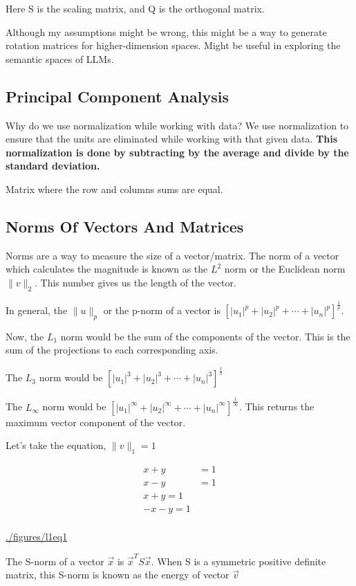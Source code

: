 \documentclass[11pt]{article}
\begin{document}
Here S is the scaling matrix, and Q is the orthogonal matrix.

Although my assumptions might be wrong, this might be a way to generate
rotation matrices for higher-dimension spaces. Might be useful in
exploring the semantic spaces of LLMs.
\subsection{Principal Component Analysis}
\label{principal-component-analysis}
Why do we use normalization while working with data? We use
normalization to ensure that the units are eliminated while working with
that given data. \textbf{This normalization is done by subtracting by the
	average and divide by the standard deviation.}

Matrix where the row and columns sums are equal.
\subsection{Norms Of Vectors And Matrices}
\label{norms-of-vectors-and-matrices}
Norms are a way to measure the size of a vector/matrix. The norm of a
vector which calculates the magnitude is known as the \(L^2\) norm or
the Euclidean norm \(\|v\|_2\). This number gives us the length of the
vector.

In general, the \(\|u\|_p\) or the p-norm of a vector is
\([|u_1|^p + |u_2|^p + \cdots + |u_n|^p]^{\frac{1}{p}}\).

Now, the \(L_1\) norm would be the sum of the components of the vector.
This is the sum of the projections to each corresponding axis.

The \(L_3\) norm would be
\([|u_1|^3 + |u_2|^3 + \cdots + |u_n|^3]^{\frac{1}{3}}\)

The \(L_\infty\) norm would be
\([|u_1|^\infty + |u_2|^\infty + \cdots + |u_n|^\infty]^{\frac{1}{\infty}}\).
This returns the maximum vector component of the vector.

Let's take the equation, \(\|v\|_1 = 1\)

\[
	\begin{aligned}
		x + y & = 1 \\
		x - y & = 1 \\
		x + y = 1   \\
		-x - y = 1  \\
	\end{aligned}
\]

\label{fig:l1eq1}
\url{./figures/l1eq1}

The S-norm of a vector \(\vec{x}\) is \(\vec{x}^T S \vec{x}\). When S is
a symmetric positive definite matrix, this S-norm is known as the energy
of vector \(\vec{v}\)
\end{document}
